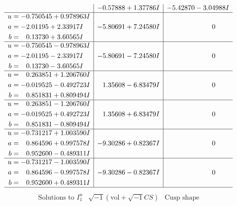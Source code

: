 \documentclass[1p]{elsarticle_modified}
\theoremstyle{definition}
\newcommand{\I}{\sqrt{-1}}
\begin{document}
$$\begin{array}{c|c|c}
 & -0.57888 + 1.37786 I & -5.42870 - 3.04988 I \\ \hline\begin{aligned}
u &= -0.750545 + 0.978963 I \\
a &= -2.01195 + 2.33917 I \\
b &= \phantom{-}0.13730 + 3.60565 I\end{aligned}
 & -5.80691 + 7.24580 I & \phantom{-0.000000 } 0 \\ \hline\begin{aligned}
u &= -0.750545 - 0.978963 I \\
a &= -2.01195 - 2.33917 I \\
b &= \phantom{-}0.13730 - 3.60565 I\end{aligned}
 & -5.80691 - 7.24580 I & \phantom{-0.000000 } 0 \\ \hline\begin{aligned}
u &= \phantom{-}0.263851 + 1.206760 I \\
a &= -0.019525 - 0.492723 I \\
b &= \phantom{-}0.851831 + 0.809494 I\end{aligned}
 & \phantom{-}1.35608 - 6.83479 I & \phantom{-0.000000 } 0 \\ \hline\begin{aligned}
u &= \phantom{-}0.263851 - 1.206760 I \\
a &= -0.019525 + 0.492723 I \\
b &= \phantom{-}0.851831 - 0.809494 I\end{aligned}
 & \phantom{-}1.35608 + 6.83479 I & \phantom{-0.000000 } 0 \\ \hline\begin{aligned}
u &= -0.731217 + 1.003590 I \\
a &= \phantom{-}0.864596 + 0.997578 I \\
b &= \phantom{-}0.952600 - 0.489311 I\end{aligned}
 & -9.30286 + 0.82367 I & \phantom{-0.000000 } 0 \\ \hline\begin{aligned}
u &= -0.731217 - 1.003590 I \\
a &= \phantom{-}0.864596 - 0.997578 I \\
b &= \phantom{-}0.952600 + 0.489311 I\end{aligned}
 & -9.30286 - 0.82367 I & \phantom{-0.000000 } 0\\
 \hline 
 \end{array}$$\newpage$$\begin{array}{c|c|c}  
\text{Solutions to }I^u_{1}& \I (\text{vol} + \sqrt{-1}CS) & \text{Cusp shape}\\

\end{array}$$
\end{document}
